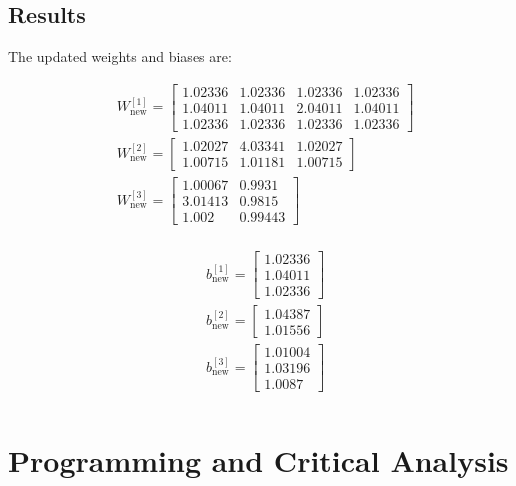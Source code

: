 \documentclass{article}
\begin{document}
\subsection*{Results}

The updated weights and biases are:

\setlength{\columnseprule}{0pt}
\begin{multicols}{2}

\begin{center}
    \begin{align*}
        &W^{[1]}_{\text{new}} = \begin{bmatrix} 1.02336 & 1.02336 & 1.02336 & 1.02336 \\  1.04011 & 1.04011 & 2.04011 & 1.04011 \\  1.02336 & 1.02336 & 1.02336 & 1.02336\end{bmatrix} \\  
        &W^{[2]}_{\text{new}} = \begin{bmatrix} 1.02027 & 4.03341 & 1.02027 \\  1.00715 & 1.01181 & 1.00715  \end{bmatrix} \\
        &W^{[3]}_{\text{new}} = \begin{bmatrix} 1.00067 & 0.9931  \\  3.01413 & 0.9815  \\  1.002   & 0.99443  \end{bmatrix} \\
    \end{align*}
\end{center}


\columnbreak

\begin{center}
    \begin{align*}
        &b^{[1]}_{\text{new}} = \begin{bmatrix} 1.02336 \\  1.04011 \\  1.02336\end{bmatrix} \\
        &b^{[2]}_{\text{new}} = \begin{bmatrix} 1.04387 \\  1.01556\end{bmatrix} \\
        &b^{[3]}_{\text{new}} = \begin{bmatrix} 1.01004 \\  1.03196 \\  1.0087 \end{bmatrix} \\
    \end{align*}
\end{center}


\end{multicols}

\newpage

\section*{Programming and Critical Analysis}
\end{document}
